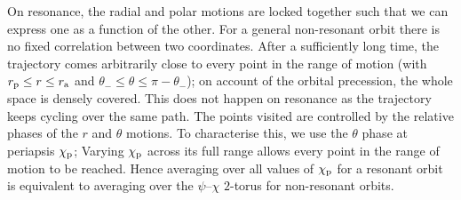 On resonance, the radial and polar motions are locked together such that we can express one as a function of the other. For a general non-resonant orbit there is no fixed correlation between two coordinates. After a sufficiently long time, the trajectory comes arbitrarily close to every point in the range of motion (with $r_\mathrm{p} \leq r \leq r_\mathrm{a}$ and $\theta_- \leq \theta \leq \pi - \theta_-$); on account of the orbital precession, the whole space is densely covered. This does not happen on resonance as the trajectory keeps cycling over the same path. The points visited are controlled by the relative phases of the $r$ and $\theta$ motions. To characterise this, we use the $\theta$ phase at periapsis $\chi_\mathrm{p}$; Varying $\chi_\mathrm{p}$ across its full range allows every point in the range of motion to be reached. Hence averaging over all values of $\chi_\mathrm{p}$ for a resonant orbit is equivalent to averaging over the $\psi$--$\chi$ $2$-torus for non-resonant orbits.

